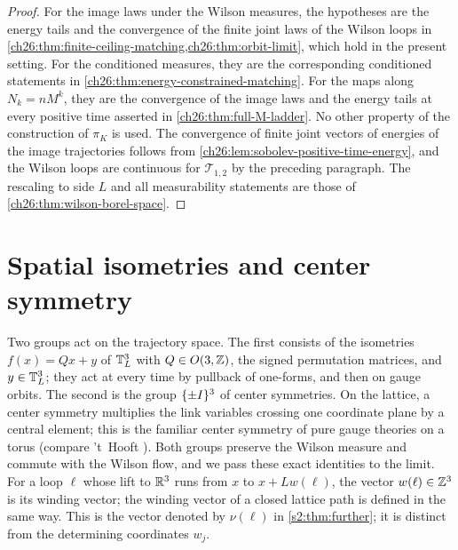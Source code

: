 \begin{proof}
For the image laws under the Wilson measures, the hypotheses are the energy tails and the convergence of the finite joint laws of the Wilson loops in \cref{ch26:thm:finite-ceiling-matching,ch26:thm:orbit-limit}, which hold in the present setting. For the conditioned measures, they are the corresponding conditioned statements in \cref{ch26:thm:energy-constrained-matching}. For the maps along $N_k=nM^k$, they are the convergence of the image laws and the energy tails at every positive time asserted in \cref{ch26:thm:full-M-ladder}. No other property of the construction of $\pi_K$ is used. The convergence of finite joint vectors of energies of the image trajectories follows from \cref{ch26:lem:sobolev-positive-time-energy}, and the Wilson loops are continuous for $\mathcal T_{1,2}$ by the preceding paragraph. The rescaling to side $L$ and all measurability statements are those of \cref{ch26:thm:wilson-borel-space}.
\end{proof}

\section{Spatial isometries and center symmetry}\label{ch26:sec:symmetry}

Two groups act on the trajectory space. The first consists of the isometries $f(x)=Qx+y$ of $\mathbb T_L^3$ with $Q\in O(3,\mathbb Z)$, the signed permutation matrices, and $y\in\mathbb T_L^3$; they act at every time by pullback of one-forms, and then on gauge orbits. The second is the group $\{\pm I\}^3$ of center symmetries. On the lattice, a center symmetry multiplies the link variables crossing one coordinate plane by a central element; this is the familiar center symmetry of pure gauge theories on a torus (compare 't~Hooft \cite{Hooft1979}). Both groups preserve the Wilson measure and commute with the Wilson flow, and we pass these exact identities to the limit. For a loop $\ell$ whose lift to $\mathbb R^3$ runs from $x$ to $x+Lw(\ell)$, the vector $w(\ell)\in\mathbb Z^3$ is its winding vector; the winding vector of a closed lattice path is defined in the same way. This is the vector denoted by $\nu(\ell)$ in \cref{s2:thm:further}; it is distinct from the determining coordinates $w_j$.

